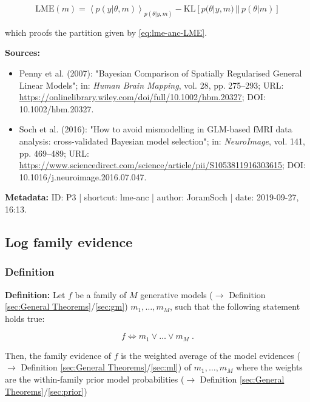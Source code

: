 \documentclass[a4paper,12pt,twoside]{book}
\begin{document}
\begin{equation} \label{eq:lme-anc-LME-AnC}
\mathrm{LME}(m) = \left\langle p(y|\theta,m) \right\rangle_{p(\theta|y,m)} - \mathrm{KL} \left[ p(\theta|y,m) \, || \, p(\theta|m) \right]
\end{equation}

which proofs the partition given by \eqref{eq:lme-anc-LME}.


\vspace{1em}
\textbf{Sources:}
\begin{itemize}
\item Penny et al. (2007): "Bayesian Comparison of Spatially Regularised General Linear Models"; in: \textit{Human Brain Mapping}, vol. 28, pp. 275–293; URL: \url{https://onlinelibrary.wiley.com/doi/full/10.1002/hbm.20327}; DOI: 10.1002/hbm.20327.
\item Soch et al. (2016): "How to avoid mismodelling in GLM-based fMRI data analysis: cross-validated Bayesian model selection"; in: \textit{NeuroImage}, vol. 141, pp. 469–489; URL: \url{https://www.sciencedirect.com/science/article/pii/S1053811916303615}; DOI: 10.1016/j.neuroimage.2016.07.047.
\end{itemize}


\vspace{1em}
\textbf{Metadata:} ID: P3 | shortcut: lme-anc | author: JoramSoch | date: 2019-09-27, 16:13.
\vspace{1em}



\subsection{Log family evidence}

\subsubsection[\textit{Definition}]{Definition} \label{sec:lfe}
\setcounter{equation}{0}

\textbf{Definition:} Let $f$ be a family of $M$ generative models ($\rightarrow$ Definition \ref{sec:General Theorems}/\ref{sec:gm}) $m_1, \ldots, m_M$, such that the following statement holds true:

\begin{equation} \label{eq:lfe-fam}
f \Leftrightarrow m_1 \vee \ldots \vee m_M \; .
\end{equation}

Then, the family evidence of $f$ is the weighted average of the model evidences ($\rightarrow$ Definition \ref{sec:General Theorems}/\ref{sec:ml}) of $m_1, \ldots, m_M$ where the weights are the within-family prior model probabilities ($\rightarrow$ Definition \ref{sec:General Theorems}/\ref{sec:prior})
\end{document}
